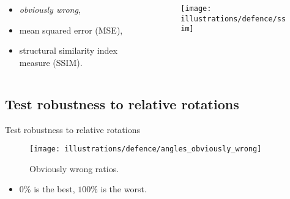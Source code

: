 \documentclass[aspectratio=169,hyperref={pdfpagelabels=false}]{beamer}
\begin{document}
    \begin{frame}
        \begin{columns}
            \begin{column}{.4\textwidth}
                \begin{itemize}
                    \item \textit{obviously wrong},
                    \pause
                    \item mean squared error (MSE),
                    \pause
                    \item structural similarity index measure (SSIM).
                \end{itemize}
            \end{column}%
            \begin{column}{.6\textwidth}
                \begin{figure}
                    \centering
                    \texttt{[image: illustrations/defence/ssim]}
                \end{figure}
            \end{column}%
        \end{columns}
    \end{frame}

    \subsection{Test robustness to relative rotations}
    \begin{frame}{Test robustness to relative rotations}
        \begin{figure}
            \centering
            \texttt{[image: illustrations/defence/angles\_obviously\_wrong]}
            \caption{Obviously wrong ratios.}
        \end{figure}
        \vspace*{-1em}%
        \begin{itemize}
            \item $0\%$ is the best, $100\%$ is the worst.
        \end{itemize}
    \end{frame}
\end{document}
